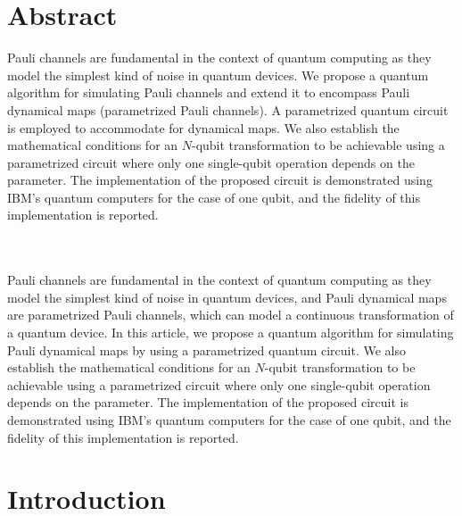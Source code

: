 \documentclass[10pt,letterpaper]{article} %
\begin{document}
\section*{Abstract}
Pauli channels are fundamental in the context of quantum computing as they
model the simplest kind of noise in quantum devices.  We propose a quantum
algorithm for simulating
Pauli channels 
and extend it to encompass Pauli dynamical maps 
(parametrized Pauli channels).
A parametrized quantum circuit is employed to accommodate for dynamical maps. 
We also establish the mathematical conditions for an
$N$-qubit transformation to be achievable using a parametrized circuit where
only one single-qubit operation depends on the parameter. 
The implementation of the proposed circuit is demonstrated using IBM's quantum computers 
for the case of one qubit, and the fidelity of this implementation is reported. 



\\
$\;$ \\


{\color{green}
Pauli channels are fundamental in the context of quantum computing as they
model the simplest kind of noise in quantum devices, and
Pauli dynamical maps are parametrized Pauli channels,
which can model a continuous transformation of a quantum device.
In this article, we propose a quantum
algorithm for simulating
Pauli dynamical maps
by using a parametrized quantum circuit.
We also establish the mathematical conditions for an
$N$-qubit transformation to be achievable using a parametrized circuit where
only one single-qubit operation depends on the parameter. 
The implementation of the proposed circuit is demonstrated using IBM's quantum computers 
for the case of one qubit, and the fidelity of this implementation is reported. 
}
\section{Introduction} %
\end{document}
